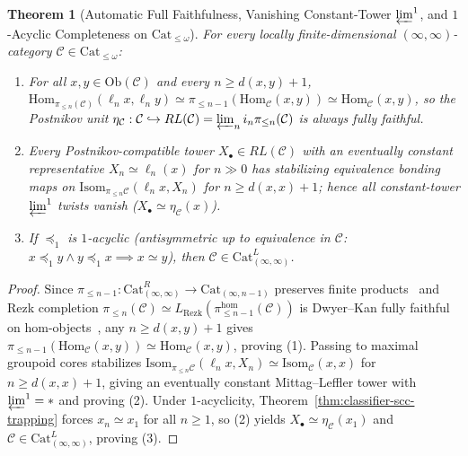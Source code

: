 \documentclass[10pt,twoside,openright]{book}
\theoremstyle{crmplain}
\newtheorem{theorem}{Theorem}[section]
\theoremstyle{crmdef}
\theoremstyle{crmremark}
\newcommand{\lean}[1]{\ignorespaces}
\newcommand{\leanwitness}{\ignorespaces}
\begin{document}
\begin{theorem}[Automatic Full Faithfulness, Vanishing Constant-Tower $\varprojlim^1$, and $1$-Acyclic Completeness on $\mathrm{Cat}_{\le \omega}$]\label{thm:ff-acyclic-completeness}%
\lean{HomotopyCRM.theorem12C_antisymmetric_postnikov_completeness}%
\leanwitness%
%
For every locally finite-dimensional $(\infty, \infty)$-category $\mathcal{C} \in \mathrm{Cat}_{\le \omega}$:
\begin{enumerate}[label=(\arabic*),leftmargin=2em]
  \item For all $x, y \in \mathrm{Ob}(\mathcal{C})$ and every $n \ge d(x, y) + 1$, $\mathrm{Hom}_{\pi_{\le n}(\mathcal{C})}(\ell_n x, \ell_n y) \simeq \pi_{\le n-1}(\mathrm{Hom}_{\mathcal{C}}(x, y)) \simeq \mathrm{Hom}_{\mathcal{C}}(x, y)$, so the Postnikov unit $\eta_{\mathcal{C}} : \mathcal{C} \hookrightarrow RL(\mathcal{C}) = \varprojlim_n i_n \pi_{\le n}(\mathcal{C})$ is always fully faithful.
  \item Every Postnikov-compatible tower $X_\bullet \in RL(\mathcal{C})$ with an eventually constant representative $X_n \simeq \ell_n(x)$ for $n \gg 0$ has stabilizing equivalence bonding maps on $\mathrm{Isom}_{\pi_{\le n}\mathcal{C}}(\ell_n x, X_n)$ for $n \ge d(x, x) + 1$; hence all constant-tower $\varprojlim^1$ twists vanish ($X_\bullet \simeq \eta_{\mathcal{C}}(x)$).
  \item If $\preceq_1$ is $1$-acyclic (antisymmetric up to equivalence in $\mathcal{C}$: $x \preceq_1 y \land y \preceq_1 x \implies x \simeq y$), then $\mathcal{C} \in \mathrm{Cat}^L_{(\infty, \infty)}$.
\end{enumerate}
\end{theorem}

\begin{proof}
Since $\pi_{\le n-1} : \mathrm{Cat}^R_{(\infty, \infty)} \to \mathrm{Cat}_{(\infty, n-1)}$ preserves finite products~\cite[Lemma~2.13 and Theorem~4.25]{ORW26} and Rezk completion $\pi_{\le n}(\mathcal{C}) \simeq L_{\mathrm{Rezk}}(\pi_{\le n-1}^{\mathrm{hom}}(\mathcal{C}))$ is Dwyer--Kan fully faithful on hom-objects~\cite[Theorem~5.6.2]{GepnerHaugseng15}, any $n \ge d(x, y) + 1$ gives $\pi_{\le n-1}(\mathrm{Hom}_{\mathcal{C}}(x, y)) \simeq \mathrm{Hom}_{\mathcal{C}}(x, y)$, proving (1). Passing to maximal groupoid cores stabilizes $\mathrm{Isom}_{\pi_{\le n}\mathcal{C}}(\ell_n x, X_n) \simeq \mathrm{Isom}_{\mathcal{C}}(x, x)$ for $n \ge d(x, x) + 1$, giving an eventually constant Mittag--Leffler tower with $\varprojlim^1 = *$ and proving (2). Under $1$-acyclicity, Theorem~\ref{thm:classifier-scc-trapping} forces $x_n \simeq x_1$ for all $n \ge 1$, so (2) yields $X_\bullet \simeq \eta_{\mathcal{C}}(x_1)$ and $\mathcal{C} \in \mathrm{Cat}^L_{(\infty, \infty)}$, proving (3).
\end{proof}
\end{document}
